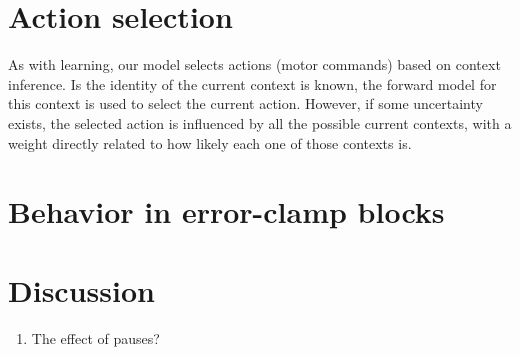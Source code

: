 \documentclass[a4paper,doc,floatsintext,natbib]{apa6}
\begin{document}
\section{Action selection}
As with learning, our model selects actions (motor commands) based on context inference. Is the identity of the current context is known, the forward model for this context is used to select the current action. However, if some uncertainty exists, the selected action is influenced by all the possible current contexts, with a weight directly related to how likely each one of those contexts is.




\section{Behavior in error-clamp blocks}






\section{Discussion}
\begin{enumerate}
\item The effect of pauses?
\end{enumerate}




\end{document}
